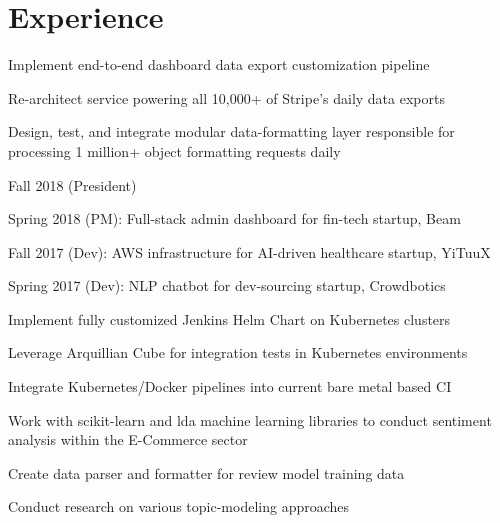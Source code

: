 \documentclass[]{deedy-resume}
\begin{document}
\begin{minipage}[t]{0.66\textwidth}


\section{Experience}
\sectionsep{}
\begin{tightemize}
\item Implement end-to-end dashboard data export customization pipeline
\item Re-architect service powering all 10,000+ of Stripe's daily data exports
\item Design, test, and integrate modular data-formatting layer responsible for processing 1 million+ object formatting requests daily
\end{tightemize}
\sectionsep{}

\begin{tightemize}
  \item Fall 2018 (President)
  \item Spring 2018 (PM): Full-stack admin dashboard for fin-tech startup, Beam
  \item Fall 2017 (Dev): AWS infrastructure for AI-driven healthcare startup, YiTuuX
  \item Spring 2017 (Dev): NLP chatbot for dev-sourcing startup, Crowdbotics
\end{tightemize}
\sectionsep{}

\sectionsep{}
\begin{tightemize}
  \item Implement fully customized Jenkins Helm Chart on Kubernetes clusters
  \item Leverage Arquillian Cube for integration tests in Kubernetes environments
  \item Integrate Kubernetes/Docker pipelines into current bare metal based CI
\end{tightemize}
\sectionsep{}

\begin{tightemize}
  \item Work with scikit-learn and lda machine learning libraries to conduct sentiment analysis within the E-Commerce sector
  \item Create data parser and formatter for review model training data
  \item Conduct research on various topic-modeling approaches
\end{tightemize}
\sectionsep{}


\end{minipage}
\end{document}
